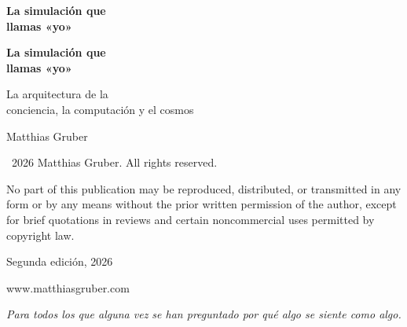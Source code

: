 \documentclass[11pt, twoside, openright]{book}
\makeatletter
\def\cleardoublepage{\clearpage\if@twoside \ifodd\c@page\else
  \thispagestyle{empty}\hbox{}\newpage
  \if@twocolumn\hbox{}\newpage\fi\fi\fi}
\makeatother
\begin{document}
\frontmatter
\pagestyle{empty}

\vspace*{3in}
\begin{center}
{\Huge\bfseries La simulación que\\[0.3cm] llamas «yo»\par}
\end{center}
\cleardoublepage

\vspace*{2in}
\begin{center}
{\Huge\bfseries La simulación que\\[0.3cm] llamas «yo»\par}
\vspace{0.8cm}
{\Large La arquitectura de la\\[0.2cm] conciencia, la computación y el cosmos\par}
\vspace{2cm}
{\large Matthias Gruber\par}
\end{center}
\clearpage

\thispagestyle{empty}
\vspace*{\fill}
{\small
\noindent \textcopyright\ 2026 Matthias Gruber. All rights reserved.\par
\vspace{0.5cm}
\noindent No part of this publication may be reproduced, distributed, or transmitted
in any form or by any means without the prior written permission of the author,
except for brief quotations in reviews and certain noncommercial uses
permitted by copyright law.\par
\vspace{0.5cm}

\vspace{0.5cm}
\noindent Segunda edición, 2026\par
\vspace{0.5cm}
\noindent www.matthiasgruber.com\par
}
\cleardoublepage

\thispagestyle{empty}
\vspace*{3in}
\begin{center}
\textit{Para todos los que alguna vez se han preguntado por qué algo se siente como algo.}
\end{center}
\cleardoublepage
\end{document}

